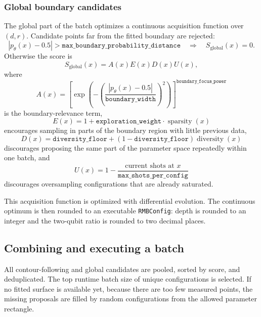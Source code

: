 \subsubsection{Global boundary candidates}

The global part of the batch optimizes a continuous acquisition function over
\((d,r)\).  Candidate points far from the fitted boundary are rejected:
\[
    |p_\theta(x)-0.5|
    >
    \texttt{max\_boundary\_probability\_distance}
    \quad \Rightarrow \quad
    S_{\mathrm{global}}(x)=0.
\]
Otherwise the score is
\[
    S_{\mathrm{global}}(x)
    =
    A(x)
    E(x)
    D(x)
    U(x),
\]
where
\[
    A(x)
    =
    \left[
    \exp\!\left(
        -\left(
            \frac{|p_\theta(x)-0.5|}
                 {\texttt{boundary\_width}}
        \right)^2
    \right)
    \right]^{\texttt{boundary\_focus\_power}}
\]
is the boundary-relevance term,
\[
    E(x)
    =
    1+\texttt{exploration\_weight}\cdot \operatorname{sparsity}(x)
\]
encourages sampling in parts of the boundary region with little previous data,
\[
    D(x)
    =
    \texttt{diversity\_floor}
    +
    (1-\texttt{diversity\_floor})\operatorname{diversity}(x)
\]
discourages proposing the same part of the parameter space repeatedly within
one batch, and
\[
    U(x)
    =
    1 - \frac{\text{current shots at }x}
             {\texttt{max\_shots\_per\_config}}
\]
discourages oversampling configurations that are already saturated.

This acquisition function is optimized with differential evolution.  The
continuous optimum is then rounded to an executable \texttt{RMBConfig}: depth is
rounded to an integer and the two-qubit ratio is rounded to two decimal places.

\subsection{Combining and executing a batch}

All contour-following and global candidates are pooled, sorted by score, and
deduplicated.  The top runtime batch size of unique configurations is selected.
If no fitted surface is available yet, because there are too few measured
points, the missing proposals are filled by random configurations from the
allowed parameter rectangle.

